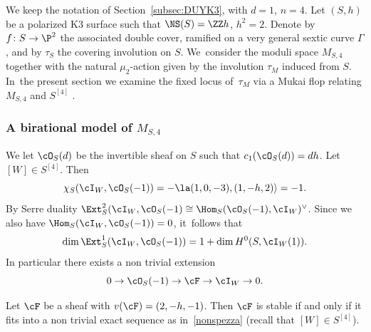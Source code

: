 We keep the notation of Section~\ref{subsec:DUYK3}, with $d=1$, $n=4$.
Let $(S,h)$ be a polarized K3 surface such that $\NS(S)=\ZZ h$, $h^2=2$. Denote by $f\colon S\to \P^2$ the associated double cover, ramified on a very general sextic curve $\mathsf{\Gamma}$, and by $\tau_S$ the covering involution on $S$. We~consider the moduli space $M_{S,4}$ together with the natural $\mu_2$-action given by the involution $\tau_M$ induced from $S$. In~the present section we examine the fixed locus of~$\tau_M$ via a Mukai flop relating $M_{S,4}$ and $S^{[4]}$ .

\subsubsection*{A birational model of $M_{S,4}$}

We let $\cO_S(d)$ be the invertible sheaf on $S$ such that $c_1(\cO_S(d))=dh$.
Let $[W]\in S^{[4]}$. Then
\begin{equation*}
\chi_S(\cI_W,\cO_S(-1))=-\la (1,0,-3),(1,-h,2)\rangle=-1.
\end{equation*}
By Serre duality
$\Ext^2_S(\cI_W,\cO_S(-1)\cong \Hom_S(\cO_S(-1),\cI_W)^{\vee}$. Since we also have $\Hom_S(\cI_W,\cO_S(-1))=0$, it~follows that
\begin{equation}\label{extacca}
\dim\Ext^1_S(\cI_W,\cO_S(-1))=1+\dim H^0(S,\cI_W(1)).
\end{equation}
In particular there exists a non trivial extension
\begin{equation}\label{nonspezza}
0\to\cO_S(-1)\to\cF\to \cI_W\to 0.
\end{equation}

\begin{prop}\label{prop:hirschen}
Let $\cF$ be a sheaf with $v(\cF)=(2,-h,-1)$. Then $\cF$ is stable if and only if it fits into a non trivial exact sequence as in~\eqref{nonspezza} (recall that $[W]\in S^{[4]}$).
\end{prop}

